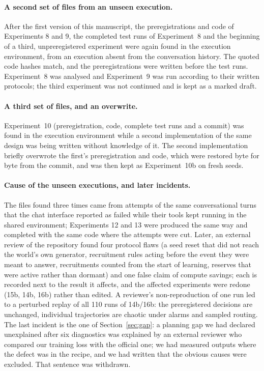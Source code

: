 \documentclass[11pt,a4paper]{article}
\begin{document}
\paragraph{A second set of files from an unseen execution.} After the first version of this manuscript, the preregistrations and code of Experiments 8 and 9, the completed test runs of Experiment~8 and the beginning of a third, unpreregistered experiment were again found in the execution environment, from an execution absent from the conversation history. The quoted code hashes match, and the preregistrations were written before the test runs. Experiment~8 was analysed and Experiment~9 was run according to their written protocols; the third experiment was not continued and is kept as a marked draft.

\paragraph{A third set of files, and an overwrite.} Experiment~10 (preregistration, code, complete test runs and a commit) was found in the execution environment while a second implementation of the same design was being written without knowledge of it. The second implementation briefly overwrote the first's preregistration and code, which were restored byte for byte from the commit, and was then kept as Experiment~10b on fresh seeds.

\paragraph{Cause of the unseen executions, and later incidents.} The files found three times came from attempts of the same conversational turns that the chat interface reported as failed while their tools kept running in the shared environment; Experiments 12 and 13 were produced the same way and completed with the same code where the attempts were cut. Later, an external review of the repository found four protocol flaws (a seed reset that did not reach the world's own generator, recruitment rules acting before the event they were meant to answer, recruitments counted from the start of learning, reserves that were active rather than dormant) and one false claim of compute savings; each is recorded next to the result it affects, and the affected experiments were redone (15b, 14b, 16b) rather than edited. A reviewer's non-reproduction of one run led to a perturbed replay of all 110 runs of 14b/16b: the preregistered decisions are unchanged, individual trajectories are chaotic under alarms and sampled routing. The last incident is the one of Section~\ref{sec:gap}: a planning gap we had declared unexplained after six diagnostics was explained by an external reviewer who compared our training loss with the official one; we had measured outputs where the defect was in the recipe, and we had written that the obvious causes were excluded. That sentence was withdrawn.
\end{document}
